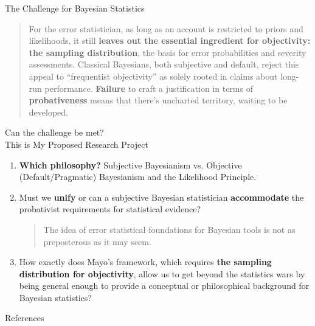 \documentclass{beamer}
\begin{document}
	\begin{frame}{The Challenge for Bayesian Statistics}
	\begin{quote}
For the error statistician, as long as an account is restricted to priors and likelihoods, it still \textbf{leaves out the essential ingredient for objectivity: the sampling distribution}, the basis for error probabilities and severity assessments. Classical Bayesians, both subjective and default, reject this appeal to ``frequentist objectivity'' as solely rooted in claims about long-run performance. \textbf{Failure} to craft a justification in terms of \textbf{probativeness} means that there's uncharted territory, waiting to be developed.

\citet[231]{Mayo2018}
\end{quote}
	\end{frame}

	
	\begin{frame}{Can the challenge be met? \\
	This is My Proposed Research Project}
	
	\begin{enumerate}
	
	\item \textbf{Which philosophy?} Subjective Bayesianism vs. Objective (Default/Pragmatic) Bayesianism and the Likelihood Principle. 
	\vfill
	\item Must we \textbf{unify} or can a subjective Bayesian statistician \textbf{accommodate} the probativist requirements for statistical evidence? 
	\vfill
	\begin{quote}
	The idea of error statistical foundations for Bayesian tools is not as preposterous as it may seem. \citep[28 -- 29]{Mayo2018}
	\end{quote}
	
	\vfill
	\item How exactly does Mayo's framework, which requires \textbf{the sampling distribution for objectivity}, allow us to get beyond the statistics wars by being general enough to provide a conceptual or philosophical background for Bayesian statistics?
	
	\end{enumerate}
	
	\end{frame}
    
\appendix
    \begin{frame}{References}
        
		
    \end{frame}
    
\end{document}
